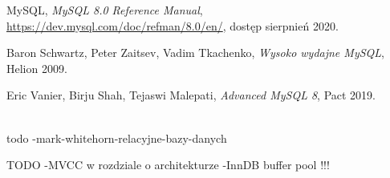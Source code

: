 \begin{thebibliography}{}
	
	 MySQL, \emph{MySQL 8.0 Reference Manual}, \url{https://dev.mysql.com/doc/refman/8.0/en/}, dostęp sierpnień 2020.
	
	 Baron Schwartz, Peter Zaitsev, Vadim Tkachenko,  \emph{Wysoko wydajne MySQL}, Helion 2009.
	
	 Eric Vanier, Birju Shah, Tejaswi Malepati,  \emph{Advanced MySQL 8}, Pact 2019.
		
	\\todo -mark-whitehorn-relacyjne-bazy-danych
	
	TODO
	-MVCC w rozdziale o architekturze
	-InnDB buffer pool !!!
	
\end{thebibliography}